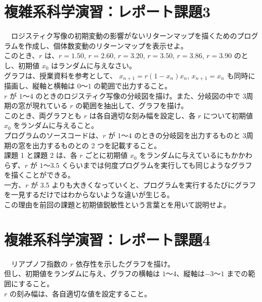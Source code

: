 \documentclass[dvipdfmx,uplatex]{jsarticle}
\begin{document}
\newpage

\section{複雑系科学演習：レポート課題3}

　ロジスティク写像の初期変動の影響がないリターンマップを描くためのプログラムを作成し、個体数変動のリターンマップを表示せよ。\\
このとき、$r$ は、$r = 1.50$, $r = 2.60$, $r = 3.20$, $r = 3.50$, $r = 3.86$, $r = 3.90$ のとし、初期値 $x_{0}$ はランダムに与えなさい。\\
グラフは、授業資料を参考として、 $x_{n+1} = r(1 − x_{n})x_{n}$, $x_{n+1} = x_{n}$ も同時に描画し、縦軸と横軸は $0$～$1$ の範囲で出力すること。\\


  $r$ が $1$～$4$ のときのロジスティク写像の分岐図を描け。また、分岐図の中で 3周期の窓が現れている $r$ の範囲を抽出して、グラフを描け。\\
このとき、両グラフとも $r$ は各自適切な刻み幅を設定し、各 $r$ について初期値 $x_{0}$ をランダムに与えること。\\
プログラムのソースコードは、$r$ が $1$～$4$ のときの分岐図を出力するものと 3周期の窓を出力するものとの 2 つを記載すること。\\

  課題 1 と課題 2 は、各 $r$ ごとに初期値 $x_{0}$ をランダムに与えているにもかかわらず、$r$ が $1$～$3.5$ くらいまでは何度プログラムを実行しても同じようなグラフを描くことができる。\\
一方、$r$ が 3.5 よりも大きくなっていくと、プログラムを実行するたびにグラフを一見するだけではわからないような違いが生じる。\\
この理由を前回の課題と初期値鋭敏性という言葉とを用いて説明せよ。\\

\section{複雑系科学演習：レポート課題4}

　リアプノフ指数の $r$ 依存性を示したグラフを描け。\\
但し、初期値をランダムに与え、グラフの横軸は $1$～$4$、縦軸は$-3$～$1$ までの範囲にすること。\\
$r$ の刻み幅は、各自適切な値を設定すること。\\
\end{document}
